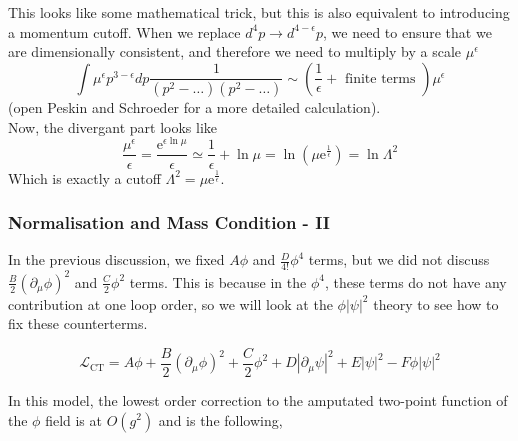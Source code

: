 \documentclass[11pt]{article}
\newcommand{\del}{\partial}
\newcommand{\e}{\mathrm{e}}
\newcommand{\ld}{\mathcal{L}}
\numberwithin{equation}{section}
\begin{document}
This looks like some mathematical trick, but this is also equivalent to introducing a momentum cutoff. When we replace \(d^4p \to d^{4-\epsilon}p\), we need to ensure that we are dimensionally consistent, and therefore we need to multiply by a scale \(\mu^\epsilon\)
\begin{equation*}
     \int \mu^{\epsilon} p^{3-\epsilon}dp\frac{1}{(p^2 - \ldots)(p^2 - \ldots)} \sim \left(\frac{1}{\epsilon} + \text{ finite terms }\right)\mu^{\epsilon}
\end{equation*}
(open Peskin and Schroeder for a more detailed calculation).\\
Now, the divergant part looks like 
\begin{equation*}
    \frac{\mu^{\epsilon}}{\epsilon} = \frac{\e^{\epsilon \ln\mu}}{\epsilon} \simeq \frac{1}{\epsilon} + \ln\mu = \ln\left(\mu \e^{\frac{1}{\epsilon}}\right) = \ln\Lambda^2
\end{equation*}
Which is exactly a cutoff \(\Lambda^2 = \mu \e^{\frac{1}{\epsilon}}\). 

\subsubsection{Normalisation and Mass Condition - II}
\label{subsubsec:BCterms}
In the previous discussion, we fixed \(A\phi\) and \(\displaystyle\frac{D}{4!}\phi^4\) terms, but we did not discuss \(\displaystyle \frac{B}{2}(\del_\mu\phi)^2\) and \(\displaystyle \frac{C}{2}\phi^2\) terms. This is because in the \(\phi^4\), these terms do not have any contribution at one loop order, so we will look at the \(\phi|\psi|^2\) theory to see how to fix these counterterms. 

\begin{equation*}
    \ld_{\text{CT}} = A\phi + \frac{B}{2}(\del_\mu \phi)^2 + \frac{C}{2}\phi^2 + D|\del_\mu \psi|^2  + E|\psi|^2 - F\phi|\psi|^2
\end{equation*}

In this model, the lowest order correction to the amputated two-point function of the \(\phi\) field is at \(O(g^2)\) and is the following, 
\begin{figure}[h]
    \centering
\end{figure}
\end{document}
